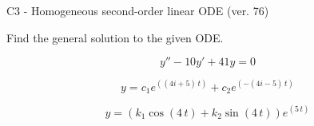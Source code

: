 \begin{exercise}
  \begin{exerciseTitle}C3 - Homogeneous second-order linear ODE (ver. 76)\end{exerciseTitle}
  \begin{exerciseStatement}
    
Find the general solution to the given ODE.

    
\[y''-10y'+41y = 0\]

  \end{exerciseStatement}
  \begin{exerciseAnswer}
    
\[y= c_{1} e^{\left(\left(4 i + 5\right) \, t\right)} + c_{2} e^{\left(-\left(4 i - 5\right) \, t\right)}\]

    
\[y= {\left(k_{1} \cos\left(4 \, t\right) + k_{2} \sin\left(4 \, t\right)\right)} e^{\left(5 \, t\right)}\]

  \end{exerciseAnswer}
\end{exercise}
